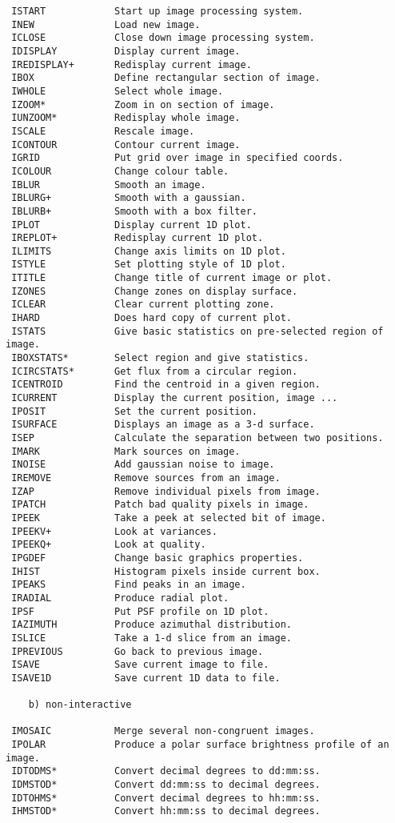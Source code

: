 \begin{verbatim}
 ISTART            Start up image processing system.
 INEW              Load new image.
 ICLOSE            Close down image processing system.
 IDISPLAY          Display current image.
 IREDISPLAY+       Redisplay current image.
 IBOX              Define rectangular section of image.
 IWHOLE            Select whole image.
 IZOOM*            Zoom in on section of image.
 IUNZOOM*          Redisplay whole image.
 ISCALE            Rescale image.
 ICONTOUR          Contour current image.
 IGRID             Put grid over image in specified coords.
 ICOLOUR           Change colour table.
 IBLUR             Smooth an image.
 IBLURG+           Smooth with a gaussian.
 IBLURB+           Smooth with a box filter.
 IPLOT             Display current 1D plot.
 IREPLOT+          Redisplay current 1D plot.
 ILIMITS           Change axis limits on 1D plot.
 ISTYLE            Set plotting style of 1D plot.
 ITITLE            Change title of current image or plot.
 IZONES            Change zones on display surface.
 ICLEAR            Clear current plotting zone.
 IHARD             Does hard copy of current plot.
 ISTATS            Give basic statistics on pre-selected region of image.
 IBOXSTATS*        Select region and give statistics.
 ICIRCSTATS*       Get flux from a circular region.
 ICENTROID         Find the centroid in a given region.
 ICURRENT          Display the current position, image ...
 IPOSIT            Set the current position.
 ISURFACE          Displays an image as a 3-d surface.
 ISEP              Calculate the separation between two positions.
 IMARK             Mark sources on image.
 INOISE            Add gaussian noise to image.
 IREMOVE           Remove sources from an image.
 IZAP              Remove individual pixels from image.
 IPATCH            Patch bad quality pixels in image.
 IPEEK             Take a peek at selected bit of image.
 IPEEKV+           Look at variances.
 IPEEKQ+           Look at quality.
 IPGDEF            Change basic graphics properties.
 IHIST             Histogram pixels inside current box.
 IPEAKS            Find peaks in an image.
 IRADIAL           Produce radial plot.
 IPSF              Put PSF profile on 1D plot.
 IAZIMUTH          Produce azimuthal distribution.
 ISLICE            Take a 1-d slice from an image.
 IPREVIOUS         Go back to previous image.
 ISAVE             Save current image to file.
 ISAVE1D           Save current 1D data to file.

    b) non-interactive

 IMOSAIC           Merge several non-congruent images.
 IPOLAR            Produce a polar surface brightness profile of an image.
 IDTODMS*          Convert decimal degrees to dd:mm:ss.
 IDMSTOD*          Convert dd:mm:ss to decimal degrees.
 IDTOHMS*          Convert decimal degrees to hh:mm:ss.
 IHMSTOD*          Convert hh:mm:ss to decimal degrees.



\end{verbatim}
